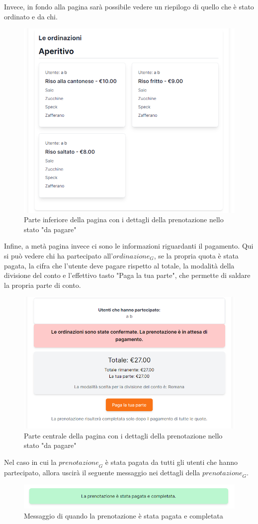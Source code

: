 Invece, in fondo alla pagina sarà possibile vedere un riepilogo di quello che è stato ordinato e da chi.
\begin{figure}[H]
    \centering
    \includegraphics[width=0.6\linewidth]{img/dettagli_prenotazione_to_pay_inferiore.png}
    \caption{Parte inferiore della pagina con i dettagli della prenotazione nello stato "da pagare"}
    \label{fig:dettagli_prenotazione_to_pay_inferiore}
\end{figure}
Infine, a metà pagina invece ci sono le informazioni riguardanti il pagamento. Qui si può vedere chi ha partecipato all'$\textit{ordinazione}_G$, se la propria quota è stata pagata, la cifra che l'utente deve pagare rispetto al totale, la modalità della divisione del conto e l'effettivo tasto "Paga la tua parte", che permette di saldare la propria parte di conto.
\begin{figure}[H]
    \centering
    \includegraphics[width=0.6\linewidth]{img/paga.png}
    \caption{Parte centrale della pagina con i dettagli della prenotazione nello stato "da pagare"}
    \label{fig:paga}
\end{figure}
Nel caso in cui la $\textit{prenotazione}_G$ è stata pagata da tutti gli utenti che hanno partecipato, allora uscirà il seguente messaggio nei dettagli della $\textit{prenotazione}_G$.
\begin{figure}[H]
    \centering
    \includegraphics[width=0.6\linewidth]{img/prenotazione_pagata_e_completata.png}
    \caption{Messaggio di quando la prenotazione è stata pagata e completata}
    \label{fig:prenotazione_pagata_e_completata}
\end{figure}
